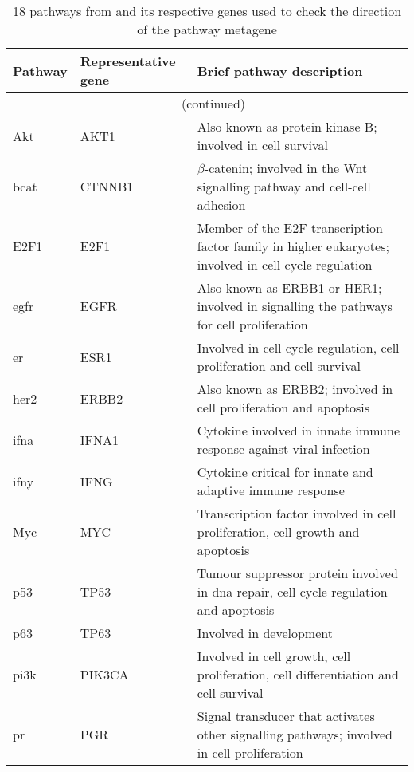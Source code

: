 \begin{longtable}{llp{8cm}}
	\caption{18 pathways from \citet{Gatza2010a} and its respective genes used to check the direction of the pathway metagene}
	\label{tab:metagene_direction}\\
	\centering
	Pathway & Representative gene & Brief pathway description\\
	\hline
	\hline
	\endfirsthead
	\multicolumn{3}{c}{\tablename\ \thetable{}\ (continued)}\\
	\hline
	\hline
	\endhead
	\hline
	\hline
	\endlastfoot
	\rule{0pt}{2.25ex}Akt         & AKT1   & Also known as protein kinase B; involved in cell survival\\
	\hline
	\rule{0pt}{2.25ex}\gls{bcat}  & CTNNB1 & $\beta$-catenin; involved in the Wnt signalling pathway and cell-cell adhesion\\
	\hline
	\rule{0pt}{2.25ex}E2F1        & E2F1   & Member of the E2F transcription factor family in higher eukaryotes; involved in cell cycle regulation\\
	\hline
	\rule{0pt}{2.25ex}\Gls{egfr}  & EGFR   & Also known as ERBB1 or HER1; involved in signalling the pathways for cell proliferation \\
	\hline
	\rule{0pt}{2.25ex}\Gls{er}    & ESR1   & Involved in cell cycle regulation, cell proliferation and cell survival\\
	\hline
	\rule{0pt}{2.25ex}\Gls{her2}  & ERBB2  & Also known as ERBB2; involved in cell proliferation and apoptosis\\
	\hline
	\rule{0pt}{2.25ex}\Gls{ifna}  & IFNA1  & Cytokine involved in innate immune response against viral infection\\
	\hline
	\rule{0pt}{2.25ex}\Gls{ifny}  & IFNG   & Cytokine critical for innate and adaptive immune response\\
	\hline
	\rule{0pt}{2.25ex}Myc         & MYC    & Transcription factor involved in cell proliferation, cell growth and apoptosis\\
	\hline
	\rule{0pt}{2.25ex}p53         & TP53   & Tumour suppressor protein involved in \acrshort{dna} repair, cell cycle regulation and apoptosis\\
	\hline
	\rule{0pt}{2.25ex}p63         & TP63   & Involved in development\\
	\hline
	\rule{0pt}{2.25ex}\Gls{pi3k}  & PIK3CA & Involved in cell growth, cell proliferation, cell differentiation and cell survival\\
	\hline
	\rule{0pt}{2.25ex}\Gls{pr}    & PGR    & Signal transducer that activates other signalling pathways; involved in cell proliferation\\

\end{longtable}
